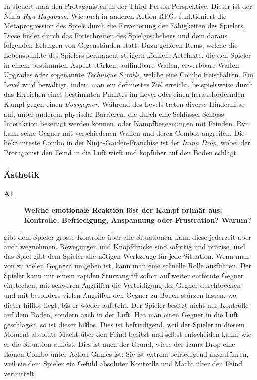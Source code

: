 \documentclass[../Main.tex]{subfiles}
\begin{document}
In  steuert man den Protagonisten in der Third-Person-Perspektive. Dieser ist der Ninja \textit{Ryu Hayabusa}. Wie auch in anderen Action-RPGs funktioniert die Metaprogression des Spiels durch die Erweiterung der Fähigkeiten des Spielers. Diese findet durch das Fortschreiten des Spielgeschehens und dem daraus folgenden Erlangen von Gegenständen statt. Dazu gehören Items, welche die Lebenspunkte des Spielers permanent steigern können, Artefakte, die den Spieler in einem bestimmten Aspekt stärken, auffindbare Waffen, erwerbbare Waffen-Upgrades oder sogenannte \textit{Technique Scrolls}, welche eine Combo freischalten. Ein Level wird bewältigt, indem man ein definiertes Ziel erreicht, beispielsweise durch das Erreichen eines bestimmten Punktes im Level oder einen herausfordernden Kampf gegen einen \textit{Bossgegner}. Während des Levels treten diverse Hindernisse auf, unter anderem physische Barrieren, die durch eine Schlüssel-Schloss-Interaktion beseitigt werden können, oder Kampfbegegnungen mit Feinden. Ryu kann seine Gegner mit verschiedenen Waffen und deren Combos angreifen. Die bekannteste Combo in der Ninja-Gaiden-Franchise ist der \textit{Izuna Drop}, wobei der Protagonist den Feind in die Luft wirft und kopfüber auf den Boden schlägt.


\subsubsection{Ästhetik}

\begin{description}
    \item[\textbf{A1}] \textbf{Welche emotionale Reaktion löst der Kampf primär aus: Kontrolle, Befriedigung, Anspannung oder Frustration? Warum?}
\end{description}

 gibt dem Spieler grosse Kontrolle über alle Situationen, kann diese jederzeit aber auch wegnehmen. Bewegungen und Knopfdrücke sind sofortig und präzise, und das Spiel gibt dem Spieler alle nötigen Werkzeuge für jede Situation. Wenn man von zu vielen Gegnern umgeben ist, kann man eine schnelle Rolle ausführen. Der Spieler kann mit einem rapiden Sturzangriff sofort auf weiter entfernte Gegner einstechen, mit schweren Angriffen die Verteidigung der Gegner durchbrechen und mit besonders vielen Angriffen den Gegner zu Boden stürzen lassen, wo dieser hilflos liegt, bis er wieder aufsteht. Der Spieler besitzt nicht nur Kontrolle auf dem Boden, sondern auch in der Luft. Hat man einen Gegner in die Luft geschlagen, so ist dieser hilflos. Dies ist befriedigend, weil der Spieler in diesem Moment absolute Macht über den Feind besitzt und selbst entscheiden kann, wie er die Situation auflöst. Dies ist auch der Grund, wieso der Izuna Drop eine Ikonen-Combo unter Action Games ist: Sie ist extrem befriedigend auszuführen, weil sie dem Spieler ein Gefühl absoluter Kontrolle und Macht über den Feind vermittelt.
\end{document}
